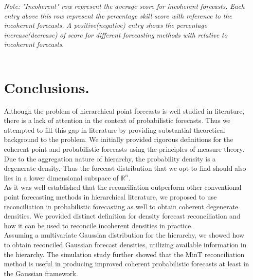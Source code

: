 \documentclass[a4paper, 11pt]{article}
\begin{document}
\textit{Note: "Incoherent" row represent the average score for incoherent forecasts. Each entry above this row represent the percentage skill score with reference to the incoherent forecasts. A positive(negative) entry shows the percentage increase(decrease) of score for different forecasting methods with relative to incoherent forecasts}.\\\\







\section{Conclusions.}

Although the problem of hierarchical point forecasts is well studied in literature, there is a lack of attention in the context of probabilistic forecasts. Thus we attempted to fill this gap in literature by providing substantial theoretical background to the problem. We initially provided rigorous definitions for the coherent point and probabilistic forecasts using the principles of measure theory. Due to the aggregation nature of hierarchy, the probability density is a degenerate density. Thus the forecast distribution that we opt to find should also lies in a lower dimensional subspace of $\bm{\mathbb{R}}^{n}$.\\ 

\noindent
As it was well established that the reconciliation outperform other conventional point forecasting methods in hierarchical literature, we proposed to use reconciliation in probabilistic forecasting as well to obtain coherent degenerate densities. We provided distinct definition for density forecast reconciliation and how it can be used to reconcile incoherent densities in practice.\\

\noindent
Assuming a multivariate Gaussian distribution for the hierarchy, we showed how to obtain reconciled Gaussian forecast densities, utilizing available information in the hierarchy. The simulation study further showed that the MinT reconciliation method \citep{Wickramasuriya2017} is useful in producing improved coherent probabilistic forecasts at least in the Gaussian framework.    

 







   



\newpage
\printbibliography
\end{document}
